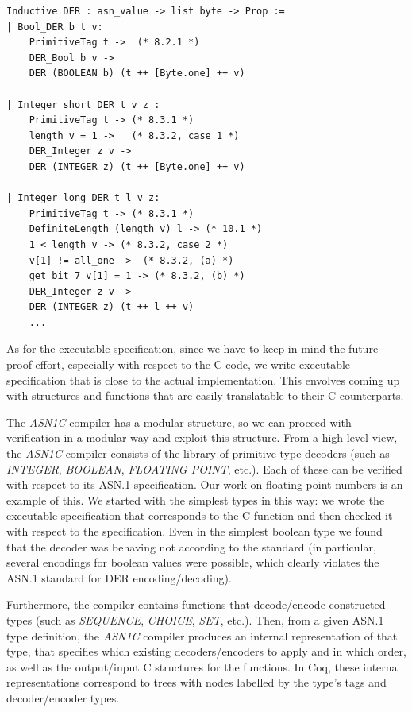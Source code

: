 \documentclass[10p,conference]{IEEEtran}
\begin{document}
\begin{lstlisting}[language=Coq]
Inductive DER : asn_value -> list byte -> Prop :=
| Bool_DER b t v:
    PrimitiveTag t ->  (* 8.2.1 *)
    DER_Bool b v ->
    DER (BOOLEAN b) (t ++ [Byte.one] ++ v)
      
| Integer_short_DER t v z : 
    PrimitiveTag t -> (* 8.3.1 *)
    length v = 1 ->   (* 8.3.2, case 1 *)  
    DER_Integer z v ->
    DER (INTEGER z) (t ++ [Byte.one] ++ v) 

| Integer_long_DER t l v z:
    PrimitiveTag t -> (* 8.3.1 *)         
    DefiniteLength (length v) l -> (* 10.1 *)
    1 < length v -> (* 8.3.2, case 2 *)
    v[1] != all_one ->  (* 8.3.2, (a) *)
    get_bit 7 v[1] = 1 -> (* 8.3.2, (b) *)
    DER_Integer z v ->
    DER (INTEGER z) (t ++ l ++ v) 
    ...

\end{lstlisting}

As for the executable specification, since we
have to keep in mind the future proof effort, especially with respect to
the C code, we write executable specification that is close to the actual implementation. This envolves coming up with structures and functions that are easily translatable to their C counterparts. 

The \emph{ASN1C} compiler has a modular structure, so we can proceed with
verification in a modular way and exploit this structure. From a high-level view, the \emph{ASN1C} compiler consists of
the library of primitive type decoders (such as \emph{INTEGER}, \emph{BOOLEAN},
\emph{FLOATING POINT}, etc.). Each of these can be verified with respect to its
ASN.1 specification. Our work on floating point numbers is an example
of this. We started with the simplest types in this way: we wrote the executable specification that corresponds to the C function and then checked it with respect to the specification. Even in the simplest boolean type we found that the decoder was behaving not according to the standard (in particular, several encodings for boolean values were possible, which clearly violates the ASN.1 standard for DER encoding/decoding).

Furthermore, the compiler contains functions that decode/encode
constructed types (such as \emph{SEQUENCE}, \emph{CHOICE}, \emph{SET}, etc.). Then, from a
given ASN.1 type definition, the \emph{ASN1C} compiler produces an internal
representation of that type, that specifies which existing
decoders/encoders to apply and in which order, as well as the
output/input C structures for the functions. In Coq,
these internal representations correspond to trees with nodes labelled by the
type's tags and decoder/encoder types.
\end{document}
